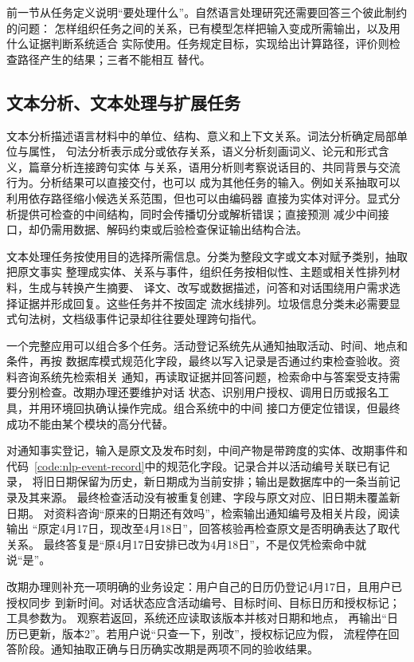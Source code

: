 前一节从任务定义说明“要处理什么”。自然语言处理研究还需要回答三个彼此制约的问题：
怎样组织任务之间的关系，已有模型怎样把输入变成所需输出，以及用什么证据判断系统适合
实际使用。任务规定目标，实现给出计算路径，评价则检查路径产生的结果；三者不能相互
替代。

\subsection{文本分析、文本处理与扩展任务}
\label{sec:nlp-analysis-processing-extended}

文本分析描述语言材料中的单位、结构、意义和上下文关系。词法分析确定局部单位与属性，
句法分析表示成分或依存关系，语义分析刻画词义、论元和形式含义，篇章分析连接跨句实体
与关系，语用分析则考察说话目的、共同背景与交流行为。分析结果可以直接交付，也可以
成为其他任务的输入。例如关系抽取可以利用依存路径缩小候选关系范围，但也可以由编码器
直接为实体对评分。显式分析提供可检查的中间结构，同时会传播切分或解析错误；直接预测
减少中间接口，却仍需用数据、解码约束或后验检查保证输出结构合法。

文本处理任务按使用目的选择所需信息。分类为整段文字或文本对赋予类别，抽取把原文事实
整理成实体、关系与事件，组织任务按相似性、主题或相关性排列材料，生成与转换产生摘要、
译文、改写或数据描述，问答和对话围绕用户需求选择证据并形成回复。这些任务并不按固定
流水线排列。垃圾信息分类未必需要显式句法树，文档级事件记录却往往要处理跨句指代。

一个完整应用可以组合多个任务。活动登记系统先从通知抽取活动、时间、地点和条件，再按
数据库模式规范化字段，最终以写入记录是否通过约束检查验收。资料咨询系统先检索相关
通知，再读取证据并回答问题，检索命中与答案受支持需要分别检查。改期办理还要维护对话
状态、识别用户授权、调用日历或报名工具，并用环境回执确认操作完成。组合系统中的中间
接口方便定位错误，但最终成功不能由某个模块的高分代替。

对通知事实登记，输入是原文及发布时刻，中间产物是带跨度的实体、改期事件和
代码~\ref{code:nlp-event-record}中的规范化字段。记录合并以活动编号关联已有记录，
将旧日期保留为历史，新日期成为当前安排；输出是数据库中的一条当前记录及其来源。
最终检查活动没有被重复创建、字段与原文对应、旧日期未覆盖新日期。
对资料咨询“原来的日期还有效吗”，检索输出通知编号及相关片段，阅读输出
“原定4月17日，现改至4月18日”，回答核验再检查原文是否明确表达了取代关系。
最终答复是“原4月17日安排已改为4月18日”，不是仅凭检索命中就说“是”。

改期办理则补充一项明确的业务设定：用户自己的日历仍登记4月17日，且用户已授权同步
到新时间。对话状态应含活动编号、目标时间、目标日历和授权标记；
工具参数为。
观察若返回，系统还应读取该版本并核对日期和地点，
再输出“日历已更新，版本2”。若用户说“只查一下，别改”，授权标记应为假，
流程停在回答阶段。通知抽取正确与日历确实改期是两项不同的验收结果。

